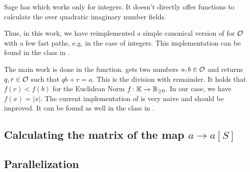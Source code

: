 Sage has  which works only for integers. It doesn't directly offer functions to calculate the  over quadratic imaginary number fields.

Thus, in this work, we have reimplemented a simple canonical version of  for $\mathcal{O}$ with a few fast paths, e.g. in the case of integers. This implementation can be found in the class  in .

The main work is done in the  function.  gets two numbers $a, b \in \mathcal{O}$ and returns $q, r \in \mathcal{O}$ such that $q b + r = a$. This is the division with remainder. It holds that $f(r) < f(b)$ for the Euclidean Norm $f \colon \mathbb{K} \rightarrow \mathbb{R}_{\ge 0}$. In our case, we have $f(x) = |x|$. The current implementation of  is very naive and should be improved. It can be found as well in the class  in .


\subsection{}
\label{solveR}
\label{impl:solveR}

\subsection{Calculating the matrix of the map $a \rightarrow a[S]$}
\label{impl:calcMatrix}

\subsection{Parallelization}
\label{impl:parallelization}
